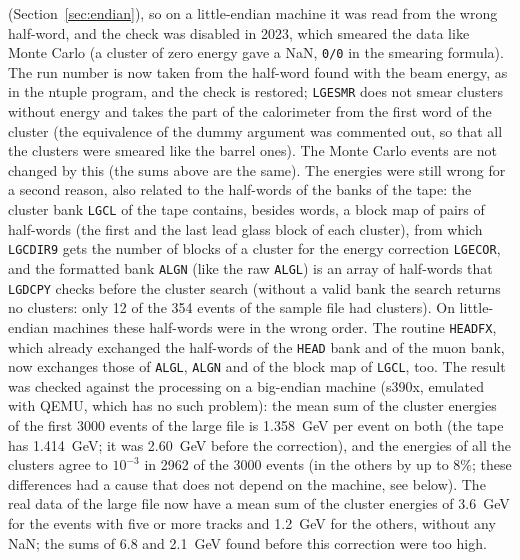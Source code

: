 (Section~\ref{sec:endian}), so on a little-endian machine it was read from the wrong half-word, and the check was disabled in 2023, which smeared the data like Monte Carlo (a cluster of zero energy gave
a NaN, \texttt{0/0} in the smearing formula). The run number is now taken from the half-word found with the beam energy, as in the ntuple program, and the check is restored; \texttt{LGESMR} does not
smear clusters without energy and takes the part of the calorimeter from the first word of the cluster (the equivalence of the dummy argument was commented out, so that all the clusters were smeared
like the barrel ones). The Monte Carlo events are not changed by this (the sums above are the same). The energies were still wrong for a second reason, also related to the half-words of the banks of the tape: the cluster bank \texttt{LGCL} of the tape
contains, besides words, a block map of pairs of half-words (the first and the last lead glass block of each cluster), from which \texttt{LGCDIR9} gets the number of blocks of
a cluster for the energy correction \texttt{LGECOR}, and the formatted bank \texttt{ALGN} (like the raw \texttt{ALGL}) is an array of half-words that \texttt{LGDCPY} checks before the
cluster search (without a valid bank the search returns no clusters: only 12 of the 354 events of the sample file had clusters). On little-endian machines these half-words were in the wrong
order. The routine \texttt{HEADFX}, which already exchanged the half-words of the \texttt{HEAD} bank and of the muon bank, now exchanges those of \texttt{ALGL}, \texttt{ALGN} and of the block map of
\texttt{LGCL}, too. The result was checked against the processing on a big-endian machine (s390x, emulated with QEMU, which has no such problem): the mean sum of the cluster energies of the
first 3000 events of the large file is 1.358~GeV per event on both (the tape has 1.414~GeV; it was 2.60~GeV before the correction), and the energies of all the clusters agree to $10^{-3}$ in 2962 of the
3000 events (in the others by up to 8\%; these differences had a cause that does not depend on the machine, see below). The real data of the large file now have a mean sum of the cluster energies of 3.6~GeV for the events with
five or more tracks and 1.2~GeV for the others, without any NaN; the sums of 6.8 and 2.1~GeV found before this correction were too high.
